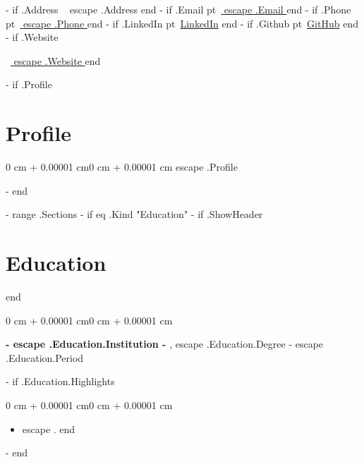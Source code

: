 \documentclass[10pt, a4paper]{article}
\newenvironment{highlights}{\begin{itemize}[topsep=0.10 cm,parsep=0.10 cm,partopsep=0pt,itemsep=0pt,leftmargin=0 cm + 10pt]}{\end{itemize}}
\newenvironment{onecolentry}{\begin{adjustwidth}{0 cm + 0.00001 cm}{0 cm + 0.00001 cm}}{\end{adjustwidth}}
\newenvironment{twocolentry}[2][]{\onecolentry\def\secondColumn{#2}\setcolumnwidth{\fill, 4.5 cm}\begin{paracol}{2}}{\switchcolumn \raggedleft \secondColumn\end{paracol}\endonecolentry}
\newenvironment{header}{\setlength{\topsep}{0pt}\par\kern\topsep\centering\linespread{1.5}}{\par\kern\topsep}
\begin{document}
    \newcommand{\AND}{\unskip\cleaders\copy\ANDbox\hskip\wd\ANDbox\ignorespaces}
    \newsavebox\ANDbox\sbox\ANDbox{$|$}

    \begin{header}
        \fontsize{25 pt}{25 pt}

        \vspace{2 pt}

        \normalsize
        {{- if .Address }}\mbox{\faGlobe}\ {{ escape .Address }}{{ end }}
        {{- if .Email }} pt\mbox{\faEnvelope}\ {\href{mailto:{{ .Email }}}{ {{ escape .Email }} }}{{ end }}
        {{- if .Phone }} pt\mbox{\faPhone}\ {\href{tel:{{ .Phone }}}{ {{ escape .Phone }} }}{{ end }}
        {{- if .LinkedIn }} pt\mbox{\faLinkedin}\ {\href{ {{ .LinkedIn }} }{LinkedIn}}{{ end }}
        {{- if .Github }} pt\mbox{\faGithub}\ {\href{ {{ .Github }} }{GitHub}}{{ end }}
        {{- if .Website }}

        \vspace{1 pt}
        \mbox{\faGlobe}\ {\href{ {{ .Website }} }{ {{ escape .Website }} }}{{ end }}
    \end{header}

    \vspace{5 pt - 0.3 cm}

    {{- if .Profile }}
    \section{Profile}
        \begin{onecolentry}
            {{ escape .Profile }}
        \end{onecolentry}
    {{- end }}

    {{- range .Sections }}
        {{- if eq .Kind "Education" }}
            {{- if .ShowHeader }}\section{Education}{{ end }}
            \begin{twocolentry}{
                {{ escape .Education.Period }}
            }
                \textbf{ {{- escape .Education.Institution -}} }, {{ escape .Education.Degree -}}\end{twocolentry}
            \vspace{0.10 cm}
            {{- if .Education.Highlights }}\begin{onecolentry}\begin{highlights}{{ range .Education.Highlights }}\item {{ escape . }}{{ end }}\end{highlights}\end{onecolentry}{{ end }}
        {{- end }}
\end{document}
